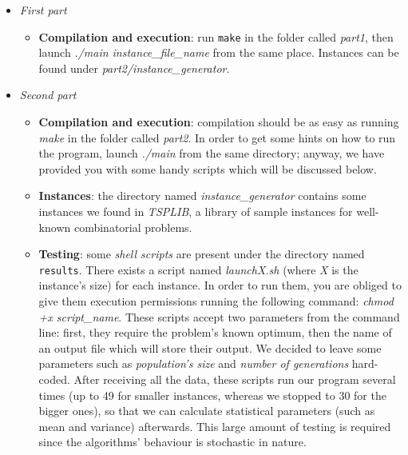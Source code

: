 \documentclass[letterpaper, 10 pt, conference]{ieeeconf}  %
\begin{document}
\begin{itemize}
\item \textit{First part} 
\begin{itemize} 
\item \textbf{Compilation and execution}: run \texttt{make} in the folder called \textit{part1}, then launch \textit{./main instance\_file\_name}
from the same place. Instances can be found under \textit{part2/instance\_generator}.
\end{itemize}

\item \textit{Second part}
\begin{itemize} 
\item \textbf{Compilation and execution}: compilation should be as easy as running \textit{make} in the folder called \textit{part2}.\newline 
In order to get some hints on how to run the program, launch \textit{./main} from the same directory; anyway, we have provided you with some handy scripts which will be discussed below.
\item \textbf{Instances}: the directory named \textit{instance\_generator} contains some instances we found in \textit{TSPLIB}, a library of sample instances for well-known combinatorial problems.
\item \textbf{Testing}: some \textit{shell scripts} are present under the directory named \texttt{results}. There exists a script named \textit{launchX.sh} (where \textit{X} is the instance's size) for each instance. In order to run them, you are obliged to give them execution permissions running the following command: \textit{chmod +x script\_name}. \newline
These scripts accept two parameters from the command line: first, they require the problem's known optimum, then the name of an output file which will store their output. \newline We decided to leave some parameters such as \textit{population's size} and \textit{number of generations} hard-coded. \newline
After receiving all the data, these scripts run our program  several times (up to 49 for smaller instances, whereas we stopped to 30 for the bigger ones), so that we can calculate statistical parameters (such as mean and variance) afterwards.
This large amount of testing is required since the algorithms' behaviour is stochastic in nature.
\end{itemize}
\end{itemize}
\end{document}
